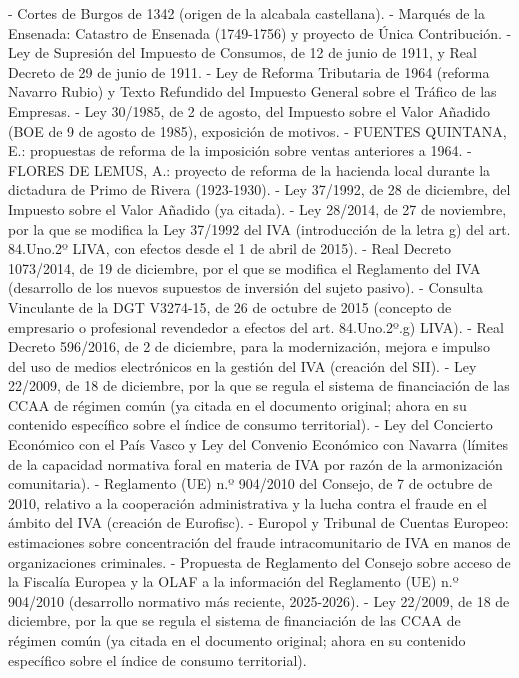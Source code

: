\documentclass[10pt,a4paper]{article}
\begin{document}
- Cortes de Burgos de 1342 (origen de la alcabala castellana).
- Marqués de la Ensenada: Catastro de Ensenada (1749-1756) y proyecto de Única Contribución.
- Ley de Supresión del Impuesto de Consumos, de 12 de junio de 1911, y Real Decreto de 29 de junio de 1911.
- Ley de Reforma Tributaria de 1964 (reforma Navarro Rubio) y Texto Refundido del Impuesto General sobre el Tráfico de las Empresas.
- Ley 30/1985, de 2 de agosto, del Impuesto sobre el Valor Añadido (BOE de 9 de agosto de 1985), exposición de motivos.
- FUENTES QUINTANA, E.: propuestas de reforma de la imposición sobre ventas anteriores a 1964.
- FLORES DE LEMUS, A.: proyecto de reforma de la hacienda local durante la dictadura de Primo de Rivera (1923-1930).
- Ley 37/1992, de 28 de diciembre, del Impuesto sobre el Valor Añadido (ya citada).
- Ley 28/2014, de 27 de noviembre, por la que se modifica la Ley 37/1992 del IVA (introducción de la letra g) del art. 84.Uno.2º LIVA, con efectos desde el 1 de abril de 2015).
- Real Decreto 1073/2014, de 19 de diciembre, por el que se modifica el Reglamento del IVA (desarrollo de los nuevos supuestos de inversión del sujeto pasivo).
- Consulta Vinculante de la DGT V3274-15, de 26 de octubre de 2015 (concepto de empresario o profesional revendedor a efectos del art. 84.Uno.2º.g) LIVA).
- Real Decreto 596/2016, de 2 de diciembre, para la modernización, mejora e impulso del uso de medios electrónicos en la gestión del IVA (creación del SII).
- Ley 22/2009, de 18 de diciembre, por la que se regula el sistema de financiación de las CCAA de régimen común (ya citada en el documento original; ahora en su contenido específico sobre el índice de consumo territorial).
- Ley del Concierto Económico con el País Vasco y Ley del Convenio Económico con Navarra (límites de la capacidad normativa foral en materia de IVA por razón de la armonización comunitaria).
- Reglamento (UE) n.º 904/2010 del Consejo, de 7 de octubre de 2010, relativo a la cooperación administrativa y la lucha contra el fraude en el ámbito del IVA (creación de Eurofisc).
- Europol y Tribunal de Cuentas Europeo: estimaciones sobre concentración del fraude intracomunitario de IVA en manos de organizaciones criminales.
- Propuesta de Reglamento del Consejo sobre acceso de la Fiscalía Europea y la OLAF a la información del Reglamento (UE) n.º 904/2010 (desarrollo normativo más reciente, 2025-2026).
- Ley 22/2009, de 18 de diciembre, por la que se regula el sistema de financiación de las CCAA de régimen común (ya citada en el documento original; ahora en su contenido específico sobre el índice de consumo territorial).
\end{document}
